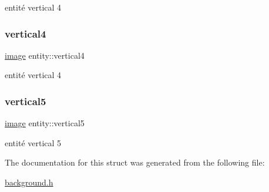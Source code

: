 entité vertical 4 \mbox{\label{structentity_aee5d2aa38170a69600a5a1e1dda3d3ff}} 
\subsubsection{\texorpdfstring{vertical4}{vertical4}}
{\footnotesize\ttfamily \hyperlink{structimage}{image} entity\+::vertical4}

entité vertical 4 \mbox{\label{structentity_a3af8b43e0be3b75cf97b176291d79bdf}} 
\subsubsection{\texorpdfstring{vertical5}{vertical5}}
{\footnotesize\ttfamily \hyperlink{structimage}{image} entity\+::vertical5}

entité vertical 5 

The documentation for this struct was generated from the following file\+:\begin{DoxyCompactItemize}
\item 
\hyperlink{background_8h}{background.\+h}\end{DoxyCompactItemize}

